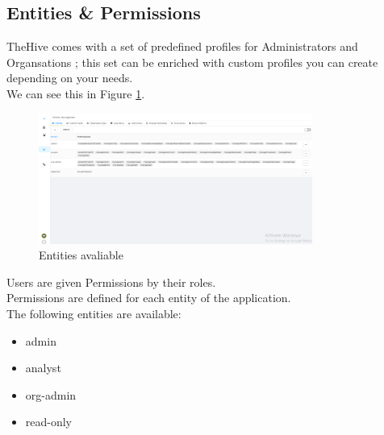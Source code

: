 \documentclass{article}
\begin{document}
\subsection{Entities \& Permissions}
TheHive comes with a set of predefined profiles for Administrators and Organsations ; this set can be enriched with custom profiles you can create depending on your needs.\\
We can see this in Figure \ref{fig:entities}.
\begin{figure}[h!]
    \centering
    \includegraphics[width=0.8\textwidth]{img6.png}
    \caption{Entities avaliable}
    \label{fig:entities}
\end{figure}

Users are given Permissions by their roles. \\
Permissions are defined for each entity of the application.\\
The following entities are available:
\begin{itemize}
    \item admin
    \item analyst
    \item org-admin
    \item read-only
\end{itemize}
\end{document}

